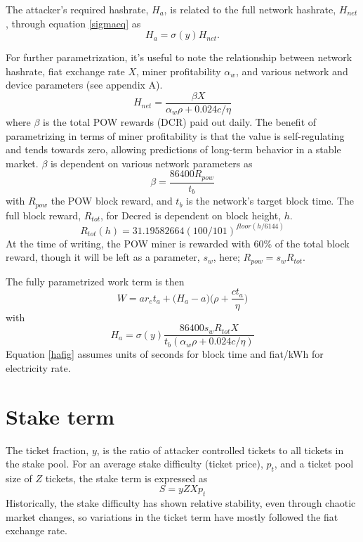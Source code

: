 \documentclass[a4paper,12pt]{article}
\begin{document}
The attacker's required hashrate, $ H_a $, is related to the full network hashrate,  $H_{net}$, through equation \ref{sigmaeq} as 
%
\begin{equation}
H_a = \sigma(y)H_{net}.
\end{equation}
 

For further parametrization, it's useful to note the relationship between network hashrate, fiat exchange rate $ X $, miner profitability $ \alpha_w $, and various network and device parameters (see appendix A).
%
\begin{equation}
H_{net} = \frac{ \beta X }{ \alpha_w \rho + 0.024 c / \eta  }
\end{equation}
%
where $\beta$ is the total POW rewards (DCR) paid out daily. The benefit of parametrizing in terms of miner profitability is that the value is self-regulating and tends towards zero, allowing predictions of long-term behavior in a stable market. $\beta$ is dependent on various network parameters as
%
\begin{equation}
\beta = \frac{ 86400 R_{pow} }{ t_b } 
\end{equation}
%
with $R_{pow}$ the POW block reward, and $t_b$ is the network's target block time. The full block reward, $R_{tot}$, for Decred is dependent on block height, $h$.
%
\begin{equation}
R_{tot}(h) = 31.19582664(100/101)^{floor(h/6144)}
\end{equation}
%
At the time of writing, the POW miner is rewarded with 60\% of the total block reward, though it will be left as a parameter, $ s_w $, here; $R_{pow} = s_w R_{tot}$. 

The fully parametrized work term is then 
%
\begin{equation}
W = ar_et_a +\Big( H_a - a \Big) \Big(\rho + \frac{ c t_a }{ \eta } \Big)
\end{equation}
%
with
%
%
\begin{equation}
\label{hafig}
H_a = \sigma(y) \frac{ 86400 s_w R_{tot} X }{ t_b (\alpha_w \rho + 0.024 c / \eta) }
\end{equation}
%
Equation \ref{hafig} assumes units of seconds for block time and fiat/kWh for electricity rate.


\section{Stake term}

The ticket fraction, $y$, is the ratio of attacker controlled tickets to all tickets in the stake pool. For an average stake difficulty (ticket price), $ p_t $, and a ticket pool size of $ Z $ tickets, the stake term is expressed as 
%
\begin{equation}
S = yZXp_t
\end{equation}
%
Historically, the stake difficulty has shown relative stability, even through chaotic market changes, so variations in the ticket term have mostly followed the fiat exchange rate. 
\end{document}
